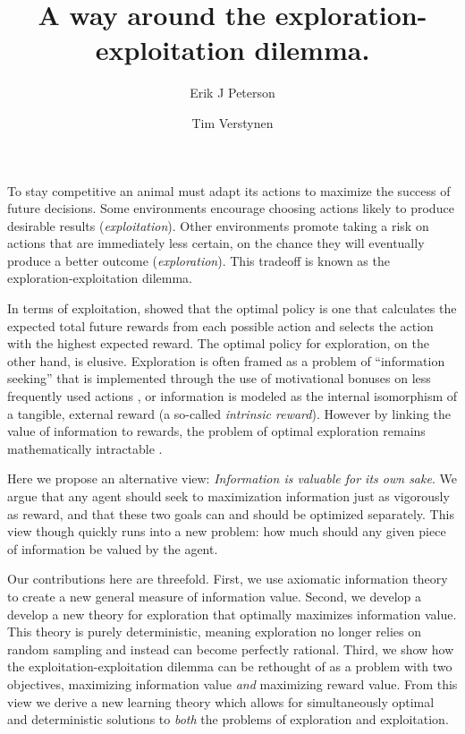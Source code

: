 \documentclass[9pt,twocolumn,twoside]{pnas-new}
\title{A way around the exploration-exploitation dilemma.}
\author[a,1]{Erik J Peterson}
\author[a,b]{Tim Verstynen}
\affil[a]{Department of Psychology}
\affil[b]{Center for the Neural Basis of Cognition, Carnegie Mellon University, Pittsburgh PA}
\begin{document}
\verticaladjustment{-2pt}
\maketitle

\thispagestyle{firststyle}
To stay competitive an animal must adapt its actions to maximize the success of future decisions. Some environments encourage choosing actions likely to produce desirable results (\textit{exploitation}). Other environments promote taking a risk on actions that are immediately less certain, on the chance they will eventually produce a better outcome (\textit{exploration}). This tradeoff is known as the exploration-exploitation dilemma.

In terms of exploitation, \cite{gittins1974dynamic} showed that the optimal policy is one that calculates the expected total future rewards from each possible action and selects the action with the highest expected reward. The optimal policy for exploration, on the other hand, is elusive. Exploration is often framed as a problem of ``information seeking'' that is implemented through the use of motivational bonuses on less frequently used actions \citep{Sutton1990, dayan1996exploration}, or information is modeled as the internal isomorphism of a tangible, external reward (a so-called \textit{intrinsic reward}). However by linking the value of information to rewards, the problem of optimal exploration remains mathematically intractable \citep{thrun1992active, dayan1996exploration, findling2018computational, gershman2018deconstructing}. 

Here we propose an alternative view: \textit{Information is valuable for its own sake}. We argue that any agent should seek to maximization information just as vigorously as reward, and that these two goals can and should be optimized separately. This view though quickly runs into a new problem: how much should any given piece of information be valued by the agent. 

Our contributions here are threefold. First, we use axiomatic information theory to create a new general measure of information value. Second, we develop a develop a new theory for exploration that optimally maximizes information value. This theory is purely deterministic, meaning exploration no longer relies on random sampling and instead can become perfectly rational. Third, we show how the exploitation-exploitation dilemma can be rethought of as a problem with two objectives, maximizing information value \textit{and} maximizing reward value. From this view we derive a new learning theory which allows for simultaneously optimal and deterministic solutions to \textit{both} the problems of exploration and exploitation.
\end{document}
